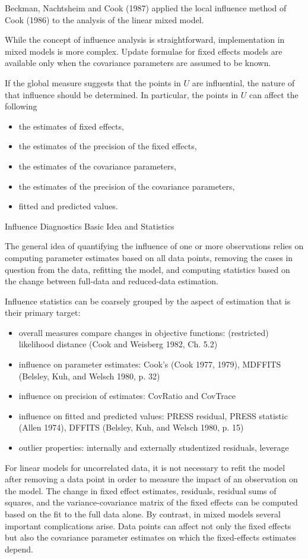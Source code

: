 \documentclass[Main.tex]{subfiles}
\begin{document}
Beckman, Nachtsheim and Cook (1987)  applied the local influence method of Cook (1986) to the analysis of the linear mixed model.

While the concept of influence analysis is straightforward, implementation in mixed models is more complex. Update formulae for fixed effects models are available only when the covariance parameters are assumed to be known.

If the global measure suggests that the points in $U$ are influential, the nature of that influence should be determined. In particular, the points in $U$ can affect the following

\begin{itemize}
\item the estimates of fixed effects,
\item the estimates of the precision of the fixed effects,
\item the estimates of the covariance parameters,
\item the estimates of the precision of the covariance parameters,
\item fitted and predicted values.
\end{itemize}

\newpage


Influence Diagnostics
Basic Idea and Statistics

The general idea of quantifying the influence of one or more observations relies on computing parameter estimates based on all data points, removing the cases in question from the data, refitting the model, and computing statistics based on the change between full-data and reduced-data estimation. 

Influence statistics can be coarsely grouped by the aspect of estimation that is their primary target:
\begin{itemize}
\item overall measures compare changes in objective functions: (restricted) likelihood distance (Cook and Weisberg 1982, Ch. 5.2)
\item influence on parameter estimates: Cook’s  (Cook 1977, 1979), MDFFITS (Belsley, Kuh, and Welsch 1980, p. 32)
\item influence on precision of estimates: CovRatio and CovTrace
\item influence on fitted and predicted values: PRESS residual, PRESS statistic (Allen 1974), DFFITS (Belsley, Kuh, and Welsch 1980, p. 15)
\item outlier properties: internally and externally studentized residuals, leverage
\end{itemize}
For linear models for uncorrelated data, it is not necessary to refit the model after removing a data point in order to measure the impact of an observation on the model. The change in fixed effect estimates, residuals, residual sums of squares, and the variance-covariance matrix of the fixed effects can be computed based on the fit to the full data alone. By contrast, in mixed models several important complications arise. Data points can affect not only the fixed effects but also the covariance parameter estimates on which the fixed-effects estimates depend. 
\end{document}
